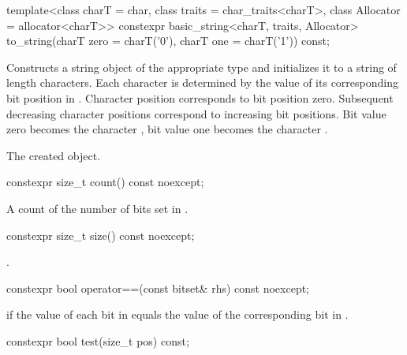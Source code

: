 %
\begin{itemdecl}
template<class charT = char,
         class traits = char_traits<charT>,
         class Allocator = allocator<charT>>
  constexpr basic_string<charT, traits, Allocator>
    to_string(charT zero = charT('0'), charT one = charT('1')) const;
\end{itemdecl}

\begin{itemdescr}
\pnum
\effects
Constructs a string object of the appropriate type
and initializes it to a string of length  characters.
Each character is determined by the value of its corresponding bit position in
.
Character position  corresponds to bit position zero.
Subsequent decreasing character positions correspond to increasing bit
positions.
Bit value zero becomes the character ,
bit value one becomes the character
.

\pnum
\returns
The created object.
\end{itemdescr}

%
\begin{itemdecl}
constexpr size_t count() const noexcept;
\end{itemdecl}

\begin{itemdescr}
\pnum
\returns
A count of the number of bits set in
.
\end{itemdescr}

%
\begin{itemdecl}
constexpr size_t size() const noexcept;
\end{itemdecl}

\begin{itemdescr}
\pnum
\returns
{}.
\end{itemdescr}

%
\begin{itemdecl}
constexpr bool operator==(const bitset& rhs) const noexcept;
\end{itemdecl}

\begin{itemdescr}
\pnum
\returns
{} if the value of each bit in
equals the value of the corresponding bit in .
\end{itemdescr}

%
\begin{itemdecl}
constexpr bool test(size_t pos) const;
\end{itemdecl}

